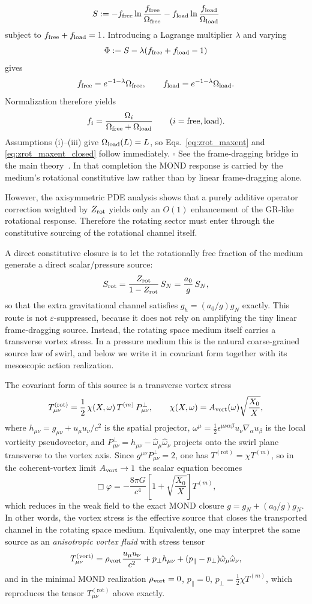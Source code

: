 \documentclass[11pt]{article}
\begin{document}
\[
S
:= -f_{\rm free}\ln\frac{f_{\rm free}}{\Omega_{\rm free}}
   -f_{\rm load}\ln\frac{f_{\rm load}}{\Omega_{\rm load}}
\]
subject to $f_{\rm free}+f_{\rm load}=1$.  Introducing a Lagrange
multiplier $\lambda$ and varying
\[
\Phi
:= S-\lambda(f_{\rm free}+f_{\rm load}-1)
\]
gives
\[
f_{\rm free}=e^{-1-\lambda}\Omega_{\rm free},
\qquad
f_{\rm load}=e^{-1-\lambda}\Omega_{\rm load}.
\]
Normalization therefore yields
\[
f_i=\frac{\Omega_i}{\Omega_{\rm free}+\Omega_{\rm load}}
\qquad (i={\rm free,load}).
\]
Assumptions (i)--(iii) give $\Omega_{\rm load}(L)=L$, so
Eqs.~\eqref{eq:zrot_maxent} and \eqref{eq:zrot_maxent_closed} follow
immediately. \hfill$\square$
See the frame-dragging bridge in the main theory~\cite{Lotishvili2026}.  In that completion the MOND response is
carried by the medium's rotational constitutive law rather than by
linear frame-dragging alone.

However, the axisymmetric PDE analysis shows that a purely additive
operator correction weighted by $Z_{\rm rot}$ yields only an $O(1)$
enhancement of the GR-like rotational response.  Therefore the
rotating sector must enter through the constitutive sourcing of the
rotational channel itself.

A direct constitutive closure is to let the rotationally
free fraction of the medium generate a direct scalar/pressure source:
\[
S_{\rm rot}
= \frac{Z_{\rm rot}}{1-Z_{\rm rot}}\,S_N
= \frac{a_0}{g}\,S_N,
\]
so that the extra gravitational channel satisfies
$g_h=(a_0/g)g_N$ exactly.  This route is not $\varepsilon$-suppressed,
because it does not rely on amplifying the tiny linear frame-dragging
source.  Instead, the rotating space medium itself carries a transverse
vortex stress.  In a pressure medium this is the natural coarse-grained
source law of swirl, and below we write it in covariant form together
with its mesoscopic action realization.

The covariant form of this source is a transverse vortex stress
\[
T^{(\mathrm{rot})}_{\mu\nu}
= \frac12\,\chi(X,\omega)\,T^{(m)}\,P^{\perp}_{\mu\nu},
\qquad
\chi(X,\omega)=A_{\rm vort}(\omega)\sqrt{\frac{X_0}{X}},
\]
where $h_{\mu\nu}=g_{\mu\nu}+u_\mu u_\nu/c^2$ is the spatial projector,
$\omega^\mu=\tfrac12\epsilon^{\mu\nu\alpha\beta}u_\nu\nabla_\alpha u_\beta$
is the local vorticity pseudovector, and
$P^{\perp}_{\mu\nu}=h_{\mu\nu}-\hat\omega_\mu\hat\omega_\nu$ projects onto
the swirl plane transverse to the vortex axis. Since
$g^{\mu\nu}P^{\perp}_{\mu\nu}=2$, one has
$T^{(\mathrm{rot})}=\chi T^{(m)}$, so in the coherent-vortex limit
$A_{\rm vort}\to1$ the scalar equation becomes
\[
\Box\varphi = -\frac{8\pi G}{c^4}\left[1+\sqrt{\frac{X_0}{X}}\right]T^{(m)},
\]
which reduces in the weak field to the exact MOND closure
$g=g_N+(a_0/g)g_N$.  In other words, the vortex stress is the
effective source that closes the transported channel in the rotating
space medium.
Equivalently, one may interpret the same source as an \emph{anisotropic
vortex fluid} with stress tensor
\[
T^{(\mathrm{vort})}_{\mu\nu}
= \rho_{\rm vort}\frac{u_\mu u_\nu}{c^2}
 + p_\perp h_{\mu\nu}
 + (p_\parallel-p_\perp)\hat\omega_\mu\hat\omega_\nu,
\]
and in the minimal MOND realization
$\rho_{\rm vort}=0$, $p_\parallel=0$,
$p_\perp=\tfrac12\chi T^{(m)}$, which reproduces the tensor
$T^{(\mathrm{rot})}_{\mu\nu}$ above exactly.
\end{document}
